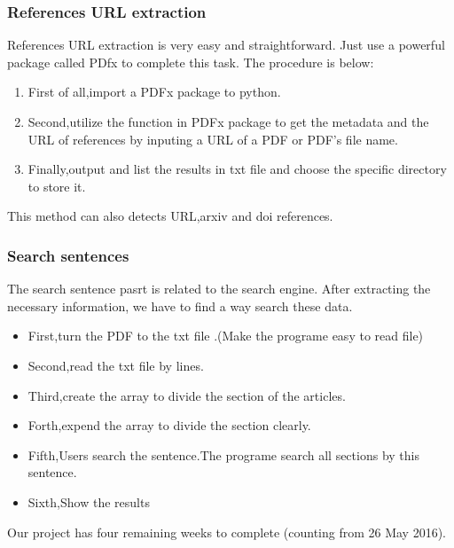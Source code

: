 \subsubsection{References URL extraction}
References URL extraction is very easy and straightforward. Just use a powerful package called PDfx to complete this task.
The procedure is below:
\begin{enumerate}
   \item  First of all,import a PDFx package to python.\\
   \item  Second,utilize the function in PDFx package to get the metadata and the URL of references by inputing a URL of a PDF or PDF's file name.\\ 
   \item  Finally,output and list the results in txt file and choose the specific directory to store it. \\
\end{enumerate}
   
   This method can also detects URL,arxiv and doi references.




\subsubsection{Search sentences}
The search sentence pasrt is  related to the search engine. After extracting the necessary information, we have to find a  way search these data.
\begin{itemize}
	\item First,turn the PDF to the txt file .(Make the programe easy to read file)\\ 
	\item Second,read the txt file by lines.\\ 	
	\item Third,create the array to divide the section of the articles.\\ 	
	\item Forth,expend the array to divide the section clearly.\\ 	
	\item Fifth,Users search the sentence.The programe search all sections by this sentence.\\
	\item Sixth,Show the results\\  		
	
\end{itemize}
Our project has four remaining weeks to complete (counting from 26 May 2016). 

\newpage %
